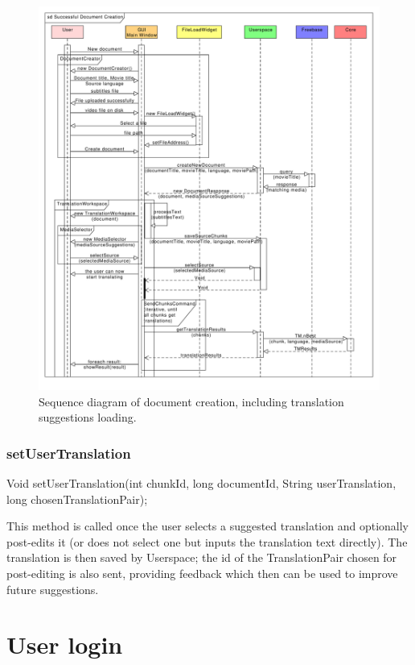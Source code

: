 \begin{figure}[h]
\begin{center}
\includegraphics[scale=0.45]{figures/document_creation_sequence.pdf}
\end{center}
\caption{Sequence diagram of document creation, including translation suggestions loading.}\label{gui:sd:document_creation}
\end{figure}

\subsubsection{setUserTranslation}
	Void setUserTranslation(int chunkId, long documentId, String userTranslation, long chosenTranslationPair);

This method is called once the user selects a suggested translation and optionally post-edits it
(or does not select one but inputs the translation text directly).
The translation is then saved by Userspace;
the id of the TranslationPair chosen for post-editing is also sent, providing feedback which then can be used to improve future suggestions.

\section{User login}

